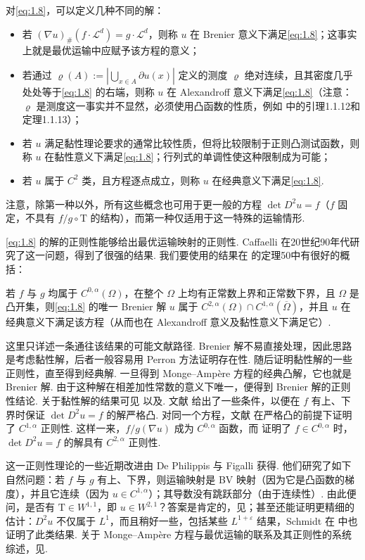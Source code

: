 对\eqref{eq:1.8}，可以定义几种不同的解：
\begin{itemize}
 \item 若 $(\nabla u)_\#(f\cdot\mathscr L^d)=g\cdot\mathscr L^d$，则称 $u$ 在 Brenier 意义下满足\eqref{eq:1.8}；这事实上就是最优运输中应赋予该方程的意义；
 \item 若通过 $\varrho(A):=|\bigcup_{x\in A}\partial u(x)|$ 定义的测度 $\varrho$ 绝对连续，且其密度几乎处处等于\eqref{eq:1.8} 的右端，则称 $u$ 在 Alexandroff 意义下满足\eqref{eq:1.8}（注意：$\varrho$ 是测度这一事实并不显然，必须使用凸函数的性质，例如\cite{b190} 中的引理1.1.12和定理1.1.13）；
 \item 若 $u$ 满足黏性理论要求的通常比较性质，但将比较限制于正则凸测试函数，则称 $u$ 在黏性意义下满足\eqref{eq:1.8}；行列式的单调性使这种限制成为可能；
 \item 若 $u$ 属于 $C^2$ 类，且方程逐点成立，则称 $u$ 在经典意义下满足\eqref{eq:1.8}.
\end{itemize}
注意，除第一种以外，所有这些概念也可用于更一般的方程 $\det D^2u=f$（$f$ 固定，不具有 $f/g\circ \mathrm{T}$ 的结构），而第一种仅适用于这一特殊的运输情形.

\eqref{eq:1.8} 的解的正则性能够给出最优运输映射的正则性. Caffaelli 在20世纪90年代研究了这一问题，得到了很强的结果. 我们要使用的结果在\cite{b292} 的定理50中有很好的概括：
\begin{theorem}\label{obj:1.54}
若 $f$ 与 $g$ 均属于 $C^{0,\alpha}(\Omega)$，在整个 $\Omega$ 上均有正常数上界和正常数下界，且 $\Omega$ 是凸开集，则\eqref{eq:1.8} 的唯一 Brenier 解 $u$ 属于 $C^{2,\alpha}(\Omega)\cap C^{1,\alpha}(\overline\Omega)$，并且 $u$ 在经典意义下满足该方程（从而也在 Alexandroff 意义及黏性意义下满足它）.
\end{theorem}
这里只详述一条通往该结果的可能文献路径. Brenier 解不易直接处理，因此思路是考虑黏性解，后者一般容易用 Perron 方法证明存在性. 随后证明黏性解的一些正则性，直至得到经典解. 一旦得到 Monge--Amp\`ere 方程的经典凸解，它也就是 Brenier 解. 由于这种解在相差加性常数的意义下唯一，便得到 Brenier 解的正则性结论. 关于黏性解的结果可见\cite{b98,b100} 以及\cite{b99}. 文献\cite{b98} 给出了一些条件，以便在 $f$ 有上、下界时保证 $\det D^2u=f$ 的解严格凸. 对同一个方程，文献\cite{b100} 在严格凸的前提下证明了 $C^{1,\alpha}$ 正则性. 这样一来，$f/g(\nabla u)$ 成为 $C^{0,\alpha}$ 函数，而\cite{b99} 证明了 $f\in C^{0,\alpha}$ 时，$\det D^2u=f$ 的解具有 $C^{2,\alpha}$ 正则性.

\label{idx:i22-p56}
这一正则性理论的一些近期改进由 De Philippis 与 Figalli 获得. 他们研究了如下自然问题：若 $f$ 与 $g$ 有上、下界，则运输映射是 BV 映射（因为它是凸函数的梯度），并且它连续（因为 $u\in C^{1,\alpha}$）；其导数没有跳跃部分（由于连续性）. 由此便问，是否有 $\mathrm{T}\in W^{1,1}$，即 $u\in W^{2,1}$？答案是肯定的，见\cite{b147,b148,b150}；甚至还能证明更精细的估计：$D^2u$ 不仅属于 $L^1$，而且稍好一些，包括某些 $L^{1+\varepsilon}$ 结果，Schmidt 在\cite{b281} 中也证明了此类结果. 关于 Monge--Amp\`ere 方程与最优运输的联系及其正则性的系统综述，见\cite{b149}.

